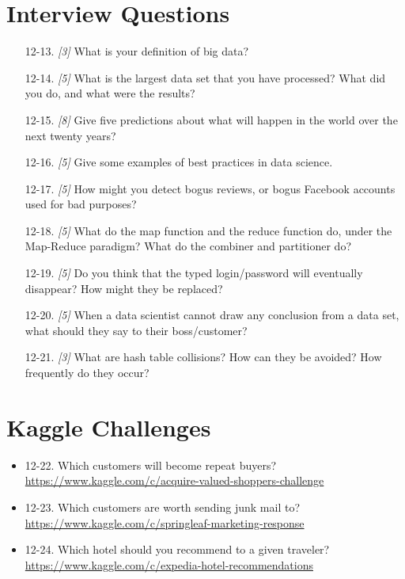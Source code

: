 \documentclass[10pt]{article}
\begin{document}
\begin{enumerate}
\section*{Interview Questions}
\begin{enumerate}
  \item[12-13.] \textit{[3]} What is your definition of big data?
  \item[12-14.] \textit{[5]} What is the largest data set that you have processed? What did you do, and what were the results?
  \item[12-15.] \textit{[8]} Give five predictions about what will happen in the world over the next twenty years?
  \item[12-16.] \textit{[5]} Give some examples of best practices in data science.
  \item[12-17.] \textit{[5]} How might you detect bogus reviews, or bogus Facebook accounts used for bad purposes?
  \item[12-18.] \textit{[5]} What do the map function and the reduce function do, under the Map-Reduce paradigm? What do the combiner and partitioner do?
  \item[12-19.] \textit{[5]} Do you think that the typed login/password will eventually disappear? How might they be replaced?
  \item[12-20.] \textit{[5]} When a data scientist cannot draw any conclusion from a data set, what should they say to their boss/customer?
\end{enumerate}

\begin{enumerate}
  \item[12-21.] \textit{[3]} What are hash table collisions? How can they be avoided? How frequently do they occur?
\end{enumerate}

\section*{Kaggle Challenges}
\begin{itemize}
  \item 12-22. Which customers will become repeat buyers? \url{https://www.kaggle.com/c/acquire-valued-shoppers-challenge}
  \item 12-23. Which customers are worth sending junk mail to? \url{https://www.kaggle.com/c/springleaf-marketing-response}
  \item 12-24. Which hotel should you recommend to a given traveler? \url{https://www.kaggle.com/c/expedia-hotel-recommendations}
\end{itemize}


\end{enumerate}
\end{document}
